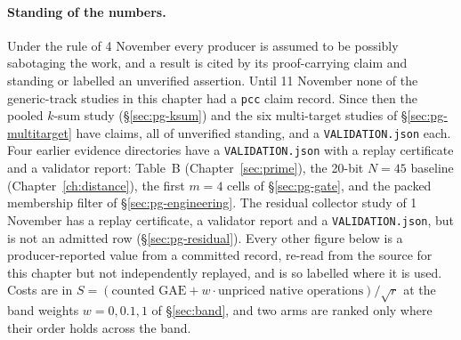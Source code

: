 \paragraph{Standing of the numbers.} Under the rule of 4 November every
producer is assumed to be possibly sabotaging the work, and a result is
cited by its proof-carrying claim and standing or labelled an unverified
assertion. Until 11 November none of the generic-track studies in this
chapter had a \texttt{pcc} claim record. Since then the pooled $k$-sum
study (\S\ref{sec:pg-ksum}) and the six multi-target studies of
\S\ref{sec:pg-multitarget} have claims, all of unverified standing, and a
\texttt{VALIDATION.json} each. Four earlier evidence directories have a
\texttt{VALIDATION.json} with a replay certificate and a validator
report: Table~B (Chapter~\ref{sec:prime}), the 20-bit $N=45$ baseline
(Chapter~\ref{ch:distance}), the first $m=4$ cells of
\S\ref{sec:pg-gate}, and the packed membership filter of
\S\ref{sec:pg-engineering}. The residual collector study of 1 November has
a replay certificate, a validator report and a \texttt{VALIDATION.json},
but is not an admitted row (\S\ref{sec:pg-residual}). Every other figure
below is a producer-reported value from a committed record, re-read from
the source for this chapter but not independently replayed, and is so
labelled where it is used. Costs are in $S=(\text{counted GAE}+w\cdot
\text{unpriced native operations})/\sqrt r$ at the band weights
$w=0,0.1,1$ of \S\ref{sec:band}, and two arms are ranked only where their
order holds across the band.

